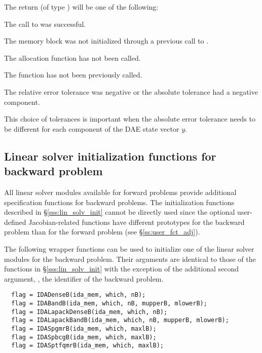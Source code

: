 {
  The return  (of type ) will be one of the following:
  \begin{args}
  \item[\Id{IDA\_SUCCESS}]
    The call to  was successful.
  \item[\Id{IDA\_MEM\_NULL}] 
    The {\idas} memory block was not initialized through a previous call to
    .
  \item[\Id{IDA\_NO\_MALLOC}] 
    The allocation function  has not been called.
  \item[\Id{IDA\_NO\_ADJ}]
    The function  has not been previously called.
  \item[\Id{IDA\_ILL\_INPUT}] 
    The relative error tolerance was negative or the absolute tolerance
    had a negative component.
  \end{args}
}
{
  This choice of tolerances is important when the absolute error tolerance needs to
  be different for each component of the DAE state vector $y$.
}

\subsection{Linear solver initialization functions for backward problem}
\label{sss:lin_solv_b}

All {\idas} linear solver modules available for forward problems
provide additional specification functions for backward problems.  The
initialization functions described in \S\ref{sss:lin_solv_init} cannot
be directly used since the optional user-defined Jacobian-related
functions have different prototypes for the backward problem than for
the forward problem (see \S\ref{ss:user_fct_adj}).

The following wrapper functions can be used to initialize one of the linear
solver modules for the backward problem. Their arguments are identical to those
of the functions in \S\ref{sss:lin_solv_init} with the exception of the additional
second argument, , the identifier of the backward problem.
\begin{verbatim}
  flag = IDADenseB(ida_mem, which, nB);
  flag = IDABandB(ida_mem, which, nB, mupperB, mlowerB);
  flag = IDALapackDenseB(ida_mem, which, nB);
  flag = IDALapackBandB(ida_mem, which, nB, mupperB, mlowerB);
  flag = IDASpgmrB(ida_mem, which, maxlB);
  flag = IDASpbcgB(ida_mem, which, maxlB);
  flag = IDASptfqmrB(ida_mem, which, maxlB);
\end{verbatim}

